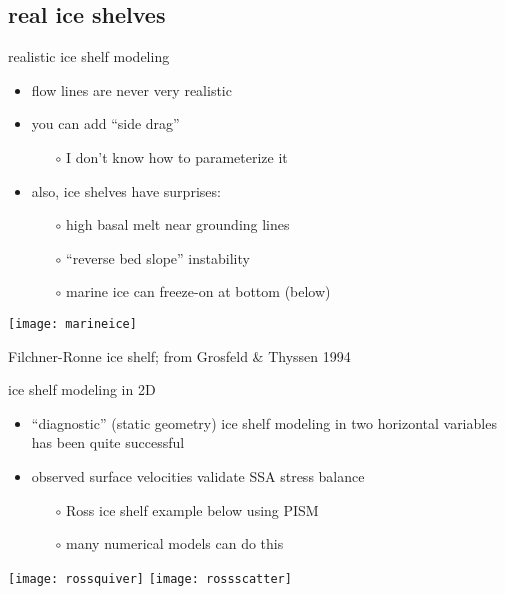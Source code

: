 \subsection{real ice shelves}

\begin{frame}{realistic ice shelf modeling}

\begin{itemize}
\item flow lines are never very realistic
\item you can add ``side drag''
  \begin{itemize}
  \item[$\circ$] I don't know how to parameterize it
  \end{itemize}
\item also, ice shelves have surprises:
  \begin{itemize}
  \item[$\circ$] high basal melt near grounding lines
  \item[$\circ$] ``reverse bed slope'' instability
  \item[$\circ$] marine ice can freeze-on at bottom (below)
  \end{itemize}
\end{itemize}

\medskip
\begin{center}
  \texttt{[image: marineice]}
  
  \medskip
  \tiny Filchner-Ronne ice shelf; from Grosfeld \& Thyssen 1994
\end{center}
\end{frame}


\begin{frame}{ice shelf modeling in 2D}

\begin{itemize}
\item ``diagnostic'' (static geometry) ice shelf modeling in two horizontal variables has been quite successful
\item observed surface velocities validate SSA stress balance
  \begin{itemize}
  \item[$\circ$] Ross ice shelf example below using PISM
  \item[$\circ$] many numerical models can do this
  \end{itemize}
\end{itemize}

\begin{center}
  \texttt{[image: rossquiver]} \quad  \texttt{[image: rossscatter]}
\end{center}
\end{frame}


